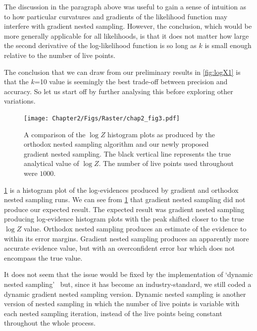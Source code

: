 The discussion in the paragraph above was useful to gain a sense of intuition as to how particular curvatures and gradients of the likelihood function may interfere with gradient nested sampling. However, the conclusion, which would be more generally applicable for all likelihoods, is that it does not matter how large the second derivative of the log-likelihood function is so long as $k$ is small enough relative to the number of live points.


The conclusion that we can draw from our preliminary results in \cref{fig:logX1} is that the $k$=10 value is seemingly the best trade-off between precision and accuracy. So let us start off by further analysing this before exploring other variations.


\begin{figure} 
\centering    
\texttt{[image: Chapter2/Figs/Raster/chap2\_fig3.pdf]}
\caption{ A comparison of the $\log Z$ histogram plots as produced by the orthodox nested sampling algorithm and our newly proposed gradient nested sampling. The black vertical line represents the true analytical value of $\log Z$. The number of live points used throughout were $1000$.}
\label{fig:loll}
\end{figure}

\cref{fig:loll} is a histogram plot of the log-evidences produced by gradient and orthodox nested sampling runs. We can see from \cref{fig:loll} that gradient nested sampling did not produce our expected result. The expected result was gradient nested sampling producing log-evidence histogram plots with the peak shifted closer to the true $\log Z$ value. Orthodox nested sampling produces an estimate of the evidence to within its error margins. Gradient nested sampling produces an apparently more accurate evidence value, but with an overconfident error bar which does not encompass the true value.

It does not seem that the issue would be fixed by the implementation of `dynamic nested sampling'~\cite{Higson_2018} but, since it has become an industry-standard, we still coded a dynamic gradient nested sampling version. Dynamic nested sampling is another version of nested sampling in which the number of live points is variable with each nested sampling iteration, instead of the live points being constant throughout the whole process.

